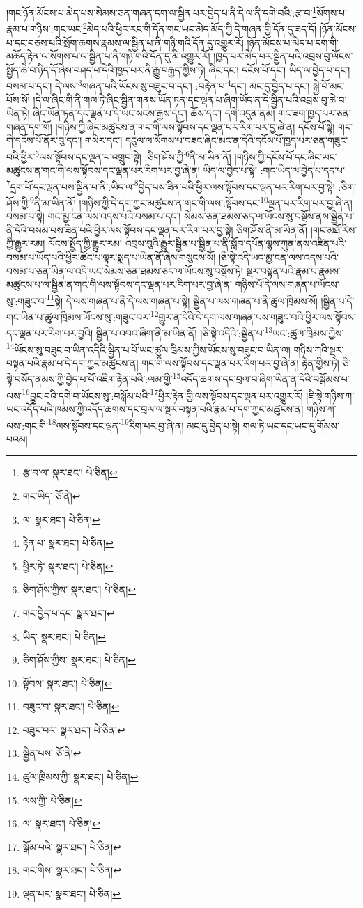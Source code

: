 །གང་ཉོན་མོངས་པ་མེད་པས་སེམས་ཅན་གཞན་དག་ལ་སྦྱིན་པར་བྱེད་པ་ནི་དེ་ལ་ནི་དགེ་བའི་:རྩ་བ་\footnote{རྩ་བ་ལ་  སྣར་ཐང་།  པེ་ཅིན། }སོགས་པ་རྣམ་པ་གཉིས་:གང་ཡང་\footnote{གང་ཡིད་  ཅོ་ནེ། }མེད་པའི་ཕྱིར་རང་གི་དོན་གང་ཡང་མེད་མོད་ཀྱི་དེ་གཞན་གྱི་དོན་དུ་ཟད་དོ། །ཉོན་མོངས་པ་དང་བཅས་པའི་སྲོག་ཆགས་རྣམས་ལ་སྦྱིན་པ་ནི་གཉི་གའི་དོན་དུ་འགྱུར་རོ། །ཉོན་མོངས་པ་མེད་པ་དག་གི་མཆོད་རྟེན་ལ་སོགས་པ་ལ་སྦྱིན་པ་ནི་གཉི་གའི་དོན་དུ་མི་འགྱུར་རོ། །ཁྱད་པར་མེད་པར་སྦྱིན་པའི་འབྲས་བུ་ལོངས་སྤྱོད་ཆེ་བ་ཉིད་དོ་ཞེས་བཤད་པ་དེའི་ཁྱད་པར་ནི་རྒྱུ་བརྒྱད་ཀྱིས་ཏེ། ཞིང་དང་། དངོས་པོ་དང་། ཡིད་ལ་བྱེད་པ་དང་། བསམ་པ་དང་། དེ་ལས་\footnote{ལ་  སྣར་ཐང་།  པེ་ཅིན། }གཞན་པའི་ཡོངས་སུ་བཟུང་བ་དང་། :བརྟེན་པ་\footnote{རྟེན་པ་  སྣར་ཐང་།  པེ་ཅིན། }དང་། མང་དུ་བྱེད་པ་དང་། སྐྱེ་བོ་མང་པོས་སོ། །དེ་ལ་ཞིང་གི་ནི་གལ་ཏེ་ཞིང་སྦྱིན་གནས་ཡོན་ཏན་དང་ལྡན་པ་ཞིག་ཡོད་ན་དེ་སྦྱིན་པའི་འབྲས་བུ་ཆེ་བ་ཡིན་ཏེ། ཞིང་ཡོན་ཏན་དང་ལྡན་པ་དེ་ཡང་སངས་རྒྱས་དང་། ཆོས་དང་། དགེ་འདུན་ནམ། གང་ཟག་ཁྱད་པར་ཅན་གཞན་དག་གོ། །གཉིས་ཀྱི་ཞིང་མཚུངས་ན་གང་གི་ལས་སྟོབས་དང་ལྡན་པར་རིག་པར་བྱ་ཞེ་ན། དངོས་པོ་སྟེ། གང་གི་དངོས་པོ་ནོར་བུ་དང་། གསེར་དང་། དངུལ་ལ་སོགས་པ་བཟང་ཞིང་མང་ན་དེའི་དངོས་པོ་ཁྱད་པར་ཅན་གཟུང་བའི་ཕྱིར་\footnote{ཕྱིར་ཏེ་  སྣར་ཐང་།  པེ་ཅིན། }ལས་སྟོབས་དང་ལྡན་པ་འགྲུབ་སྟེ། :ཅིག་ཤོས་ཀྱི་\footnote{ཅིག་ཤོས་ཀྱིས་  སྣར་ཐང་།  པེ་ཅིན། }ནི་མ་ཡིན་ནོ། །གཉིས་ཀྱི་དངོས་པོ་དང་ཞིང་ཡང་མཚུངས་ན་གང་གི་ལས་སྟོབས་དང་ལྡན་པར་རིག་པར་བྱ་ཞེ་ན། ཡིད་ལ་བྱེད་པ་སྟེ། :གང་ཡིད་ལ་བྱེད་པ་དད་པ་\footnote{གང་བྱེད་པ་དང་  སྣར་ཐང་། }དྲག་པོ་དང་ལྡན་པས་སྦྱིན་པ་ནི་:ཡིད་ལ་\footnote{ཡིད་  སྣར་ཐང་།  པེ་ཅིན། }བྱེད་པས་ཟིན་པའི་ཕྱིར་ལས་སྟོབས་དང་ལྡན་པར་རིག་པར་བྱ་སྟེ། :ཅིག་ཤོས་ཀྱི་\footnote{ཅིག་ཤོས་ཀྱིས་  སྣར་ཐང་།  པེ་ཅིན། }ནི་མ་ཡིན་ནོ། །གཉིས་ཀྱི་དེ་དག་ཀྱང་མཚུངས་ན་གང་གི་ལས་:སྟོབས་དང་\footnote{སྟོབས་  སྣར་ཐང་།  པེ་ཅིན། }ལྡན་པར་རིག་པར་བྱ་ཞེ་ན། བསམ་པ་སྟེ། གང་མྱ་ངན་ལས་འདས་པའི་བསམ་པ་དང་། སེམས་ཅན་ཐམས་ཅད་ལ་ཡོངས་སུ་བསྔོས་ནས་སྦྱིན་པ་ནི་དེའི་བསམ་པས་ཟིན་པའི་ཕྱིར་ལས་སྟོབས་དང་ལྡན་པར་རིག་པར་བྱ་སྟེ། ཅིག་ཤོས་ནི་མ་ཡིན་ནོ། །གང་མཐོ་རིས་ཀྱི་རྒྱུར་རམ། ལོངས་སྤྱོད་ཀྱི་རྒྱུར་རམ། འབྲས་བུའི་རྒྱུར་སྦྱིན་པ་སྦྱིན་པ་ནི་སློབ་དཔོན་ལྷས་ཀུན་ནས་འཛིན་པའི་བསམ་པ་ཡོད་པའི་ཕྱིར་ཚོང་པ་ལྟར་སྨད་པ་ཡིན་ནོ་ཞེས་གསུངས་སོ། །ཅི་སྟེ་འདི་ཡང་མྱ་ངན་ལས་འདས་པའི་བསམ་པ་ཅན་ཡིན་ལ་འདི་ཡང་སེམས་ཅན་ཐམས་ཅད་ལ་ཡོངས་སུ་བསྔོས་ཏེ། སྔར་བསྟན་པའི་རྣམ་པ་རྣམས་མཚུངས་པ་ལ་སྦྱིན་ན་གང་གི་ལས་སྟོབས་དང་ལྡན་པར་རིག་པར་བྱ་ཞེ་ན། གཉིས་པོ་དེ་ལས་གཞན་པ་ཡོངས་སུ་:གཟུང་བ་\footnote{བཟུང་བ་  སྣར་ཐང་།  པེ་ཅིན། }སྟེ། དེ་ལས་གཞན་པ་ནི་དེ་ལས་གཞན་པ་སྟེ། སྦྱིན་པ་ལས་གཞན་པ་ནི་ཚུལ་ཁྲིམས་སོ། །སྦྱིན་པ་དེ་གང་ཡིན་པ་ཚུལ་ཁྲིམས་ཡོངས་སུ་:གཟུང་བར་\footnote{བཟུང་བར་  སྣར་ཐང་།  པེ་ཅིན། }གྱུར་ན་དེའི་དེ་དག་ལས་གཞན་པས་གཟུང་བའི་ཕྱིར་ལས་སྟོབས་དང་ལྡན་པར་རིག་པར་བྱའི། སྦྱིན་པ་འབའ་ཞིག་ནི་མ་ཡིན་ནོ། །ཅི་སྟེ་འདིའི་:སྦྱིན་པ་\footnote{སྦྱིན་པས་  ཅོ་ནེ། }ཡང་:ཚུལ་ཁྲིམས་ཀྱིས་\footnote{ཚུལ་ཁྲིམས་ཀྱི་  སྣར་ཐང་།  པེ་ཅིན། }ཡོངས་སུ་བཟུང་བ་ཡིན་འདིའི་སྦྱིན་པ་པོ་ཡང་ཚུལ་ཁྲིམས་ཀྱིས་ཡོངས་སུ་བཟུང་བ་ཡིན་ལ། གཉིས་ཀའི་སྔར་བསྟན་པའི་རྣམ་པ་དེ་དག་ཀྱང་མཚུངས་ན། གང་གི་ལས་སྟོབས་དང་ལྡན་པར་རིག་པར་བྱ་ཞེ་ན། རྟེན་གྱིས་ཏེ། ཅི་སྟེ་བསོད་ནམས་ཀྱི་བྱེད་པ་པོ་འཇིག་རྟེན་པའི་:ལམ་གྱི་\footnote{ལས་ཀྱི་  པེ་ཅིན། }འདོད་ཆགས་དང་བྲལ་བ་ཞིག་ཡིན་ན་དེའི་བསྒོམས་པ་ལས་\footnote{ལ་  སྣར་ཐང་།  པེ་ཅིན། }བྱུང་བའི་དགེ་བ་ཡོངས་སུ་:བསྒོམ་པའི་\footnote{སྒོམ་པའི་  སྣར་ཐང་།  པེ་ཅིན། }ཕྱིར་རྟེན་གྱི་ལས་སྟོབས་དང་ལྡན་པར་འགྱུར་རོ། །ཇི་སྟེ་གཉིས་ཀ་ཡང་འདོད་པའི་ཁམས་ཀྱི་འདོད་ཆགས་དང་བྲལ་ལ་སྔར་བསྟན་པའི་རྣམ་པ་དག་ཀྱང་མཚུངས་ན། གཉིས་ཀ་ལས་:གང་གི་\footnote{གང་གིས་  སྣར་ཐང་།  པེ་ཅིན། }ལས་སྟོབས་དང་ལྡན་\footnote{ལྡན་པར་  སྣར་ཐང་།  པེ་ཅིན། }རིག་པར་བྱ་ཞེ་ན། མང་དུ་བྱེད་པ་སྟེ། གལ་ཏེ་ཡང་དང་ཡང་དུ་གོམས་པའམ། 